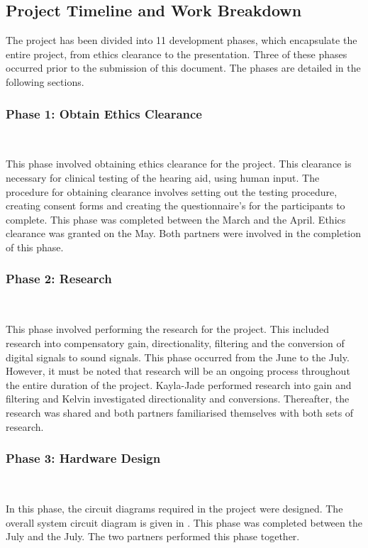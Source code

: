 \documentclass[10pt,twocolumn]{witseiepaper}
\begin{document}
\subsection{Project Timeline and Work Breakdown}
The project has been divided into 11 development phases, which encapsulate the entire project, from ethics clearance to the presentation. Three of these phases occurred prior to the submission of this document. The phases are detailed in the following sections.

\subsubsection*{Phase 1: Obtain Ethics Clearance} $    $

This phase involved obtaining ethics clearance for the project. This clearance is necessary for clinical testing of the hearing aid, using human input. The procedure for obtaining clearance involves setting out the testing procedure, creating consent forms and creating the questionnaire's for the participants to complete. This phase was completed between the  March and the  April. Ethics clearance was granted on the  May. Both partners were involved in the completion of this phase.

\subsubsection*{Phase 2: Research} $    $

This phase involved performing the research for the project. This included research into compensatory gain, directionality, filtering and the conversion of digital signals to sound signals. This phase occurred from the  June to the  July. However, it must be noted that research will be an ongoing process throughout the entire duration of the project. Kayla-Jade performed research into gain and filtering and Kelvin investigated directionality and conversions. Thereafter, the research was shared and both partners familiarised themselves with both sets of research.

\subsubsection*{Phase 3: Hardware Design } $    $

In this phase, the circuit diagrams required in the project were designed. The overall system circuit diagram is given in . This phase was completed between the  July and the  July. The two partners performed this phase together.
\end{document}
